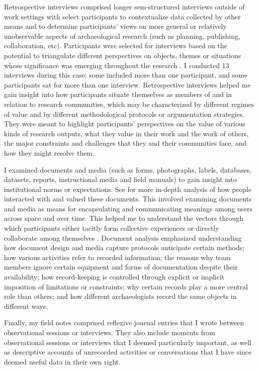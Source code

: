 \documentclass{article}
\begin{document}
Retrospective interviews comprised longer sem-structured interviews
outside of work settings with select participants to contextualize data
collected by other means and to determine participants' views on more
general or relatively unobservable aspects of archaeological research
(such as planning, publishing, collaboration, etc). Participants were
selected for interviews based on the potential to triangulate different
perspectives on objects, themes or situations whose significance was
emerging throughout the research \parencite{morse2019}. I conducted 13
interviews during this case; some included more than one participant,
and some participants sat for more than one interview. Retrospective
interviews helped me gain insight into how participants situate
themselves as members of and in relation to research communities, which
may be characterized by different regimes of value and by different
methodological protocols or argumentation strategies. They were meant to
highlight participants' perspectives on the value of various kinds of
research outputs, what they value in their work and the work of others,
the major constraints and challenges that they and their communities
face, and how they might resolve them.

I examined documents and media (such as forms, photographs, labels,
databases, datasets, reports, instructional media and field manuals) to
gain insight into institutional norms or expectations. See
\textcites{batist2024a}{batist-alienation} for more in-depth
analysis of how people interacted with and valued these documents. This
involved examining documents and media as means for encapsulating and
communicating meanings among users across space and over time. This
helped me to understand the vectors through which participants either
tacitly form collective experiences or directly collaborate among
themselves \parencites{huvila2011}{huvila2016}{yarrow2008}. Document
analysis emphasized understanding how document design and media capture
protocols anticipate certain methods; how various activities refer to
recorded information; the reasons why team members ignore certain
equipment and forms of documentation despite their availability; how
record-keeping is controlled through explicit or implicit imposition of
limitations or constraints; why certain records play a more central
role than others; and how different archaeologists record the same
objects in different ways.

Finally, my field notes comprised reflexive journal entries that I wrote
between observational sessions or interviews. They also include moments
from observational sessions or interviews that I deemed particularly
important, as well as descriptive accounts of unrecorded activities or
conversations that I have since deemed useful data in their own right.
\end{document}
